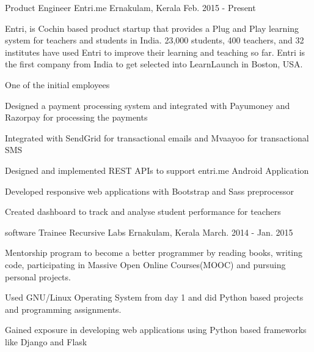 

\begin{cventries}

  \cventry
    {Product Engineer} %
    {Entri.me} %
    {Ernakulam, Kerala} %
    {Feb. 2015 - Present} %
    {\begin{cvparagraph} %
       Entri, is Cochin based product startup that provides a Plug and Play learning system for teachers and students in India. 23,000 students, 400 teachers, and 32 institutes have used Entri to improve their learning and teaching so far. Entri is the first company from India to get selected into LearnLaunch in Boston, USA.
\end{cvparagraph}
}
    {
      \begin{cvitems} %
        \item {One of the initial employees}
        \item {Designed a payment processing system and integrated with Payumoney and Razorpay for processing the payments}
        \item{Integrated with SendGrid for transactional emails and Mvaayoo for transactional SMS}
        \item{Designed and implemented REST APIs to support entri.me Android Application}
        \item{Developed responsive web applications with Bootstrap and Sass preprocessor}
        \item{Created dashboard to track and analyse student performance for teachers}
      \end{cvitems}
    }

  \cventry
    {software Trainee} %
    {Recursive Labs} %
    {Ernakulam, Kerala} %
    {March. 2014 - Jan. 2015} %
    {\begin{cvparagraph} %
       Mentorship program to become a better programmer by reading books, writing code, participating in Massive Open Online Courses(MOOC) and pursuing personal projects.
\end{cvparagraph}
}
    {
      \begin{cvitems} %
        \item {Used GNU/Linux Operating System from day 1 and did Python based projects and programming assignments.}
        \item {Gained exposure in developing web applications using Python based frameworks like Django and Flask}
      \end{cvitems}
    }

\end{cventries}
